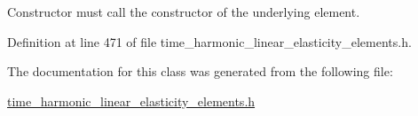 Constructor must call the constructor of the underlying element. 



Definition at line 471 of file time\+\_\+harmonic\+\_\+linear\+\_\+elasticity\+\_\+elements.\+h.



The documentation for this class was generated from the following file\+:\begin{DoxyCompactItemize}
\item 
\hyperlink{time__harmonic__linear__elasticity__elements_8h}{time\+\_\+harmonic\+\_\+linear\+\_\+elasticity\+\_\+elements.\+h}\end{DoxyCompactItemize}
